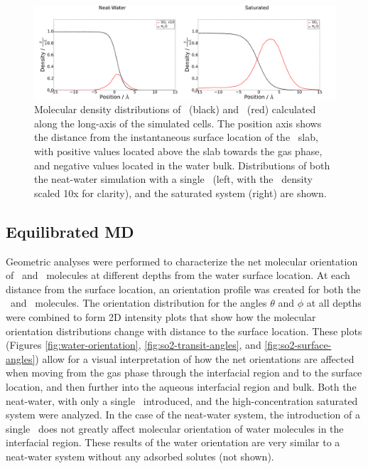 \documentclass{article}
\begin{document}
\begin{figure}[h!]
	\begin{center}
		\includegraphics[scale=1.0]{images/density.png}
		\caption{Molecular density distributions of \wat~(black) and \suldiox~(red) calculated along the long-axis of the simulated cells. The position axis shows the distance from the instantaneous surface location of the \wat~slab, with positive values located above the slab towards the gas phase, and negative values located in the water bulk. Distributions of both the neat-water simulation with a single \suldiox~(left, with the \suldiox~density scaled 10x for clarity), and the saturated system (right) are shown.}
		\label{fig:density}
	\end{center}
\end{figure}

\subsection{Equilibrated MD}

Geometric analyses were performed to characterize the net molecular orientation of \wat~and \suldiox~molecules at different depths from the water surface location. At each distance from the surface location, an orientation profile was created for both the \wat~and \suldiox~molecules. The orientation distribution for the angles $\theta$ and $\phi$ at all depths were combined to form 2D intensity plots that show how the molecular orientation distributions change with distance to the surface location. These plots (Figures \ref{fig:water-orientation}, \ref{fig:so2-transit-angles}, and \ref{fig:so2-surface-angles}) allow for a visual interpretation of how the net orientations are affected when moving from the gas phase through the interfacial region and to the surface location, and then further into the aqueous interfacial region and bulk. Both the neat-water, with only a single \suldiox~introduced, and the high-concentration saturated system were analyzed. In the case of the neat-water system, the introduction of a single \suldiox~does not greatly affect molecular orientation of water molecules in the interfacial region. These results of the water orientation are very similar to a neat-water system without any adsorbed solutes (not shown).
\end{document}
